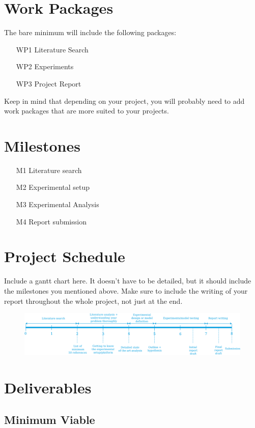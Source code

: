 \documentclass[rnd]{mas_proposal}
\begin{document}
\section{Work Packages}
The bare minimum will include the following packages:
\begin{enumerate}
    \item[WP1] Literature Search
    \item[WP2] Experiments
    \item[WP3] Project Report
\end{enumerate}
Keep in mind that depending on your project, you will probably need to add work packages that are more suited to your projects.

\section{Milestones}
\begin{enumerate}
    \item[M1] Literature search
    \item[M2] Experimental setup
    \item[M3] Experimental Analysis
    \item[M4] Report submission
\end{enumerate}

\section{Project Schedule}
Include a gantt chart here. It doesn't have to be detailed, but it should include the milestones you mentioned above.
Make sure to include the writing of your report throughout the whole project, not just at the end.

\begin{figure}[h!]
    \includegraphics[width=\textwidth]{rnd_deliverable_timeline}
    \caption{}
    \label{}
\end{figure}

\section{Deliverables}
\subsection{Minimum Viable}
\end{document}
